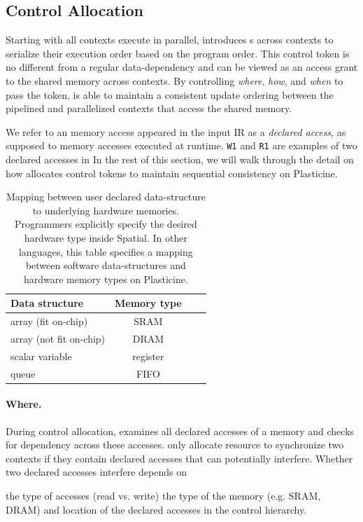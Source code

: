 \subsection{Control Allocation} 
\label{sec:sync}
Starting with all contexts execute in parallel, \name introduces s across contexts
to serialize their execution order based on the program order.
This control token is no different from a regular data-dependency and can be viewed as 
an access grant to the shared memory across contexts. 
By controlling {\em where}, {\em how}, and {\em when} to pass the token, \name 
is able to maintain a consistent update ordering between the pipelined and parallelized contexts that 
access the shared memory.

We refer to an memory access appeared in the input IR as a \emph{declared access}, as supposed to
memory accesses executed at runtime.
\texttt{W1} and \texttt{R1} are examples of two declared accesses in 
In the rest of this section, we will walk through the detail on how \name allocates control tokens
to maintain sequential consistency on Plasticine.

\begin{table}
  \centering
\begin{tabular}{lccc}
  \toprule
 Data structure & Memory type \\ \midrule
  array (fit on-chip) & SRAM \\
  array (not fit on-chip) & DRAM \\
  scalar variable & register \\
  queue & FIFO \\
 \bottomrule
\end{tabular}
\caption[Mapping between data-structure to hardware memories]{
  Mapping between user declared data-structure to underlying hardware memories. 
  Programmers explicitly specify the desired hardware type inside Spatial. 
  In other languages, this table specifies a mapping between software data-structures 
  and hardware memory types on Plasticine.
}
\label{tab:memtype}
\end{table}

\paragraph{Where.}
During control allocation, \name examines all declared accesses of a memory and checks for dependency across these accesses.
\name only allocate resource to synchronize two contexts if they contain declared accesses that can potentially interfere.
Whether two declared accesses interfere depends on 
\begin{outline}
  \1 the type of accesses (read vs. write)
  \1 the type of the memory (e.g. SRAM, DRAM)
  \1 and location of the declared accesses in the control hierarchy.
\end{outline}

